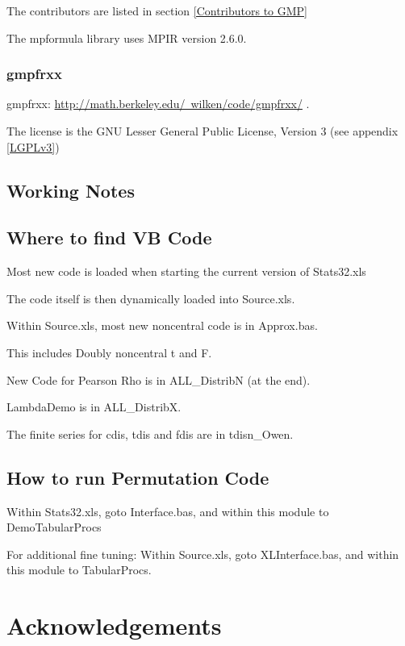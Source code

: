The contributors are listed in section \ref{Contributors to GMP}

The mpformula library uses MPIR version 2.6.0.



\subsection{gmpfrxx}
gmpfrxx: \href{http://math.berkeley.edu/~wilken/code/gmpfrxx/}{http://math.berkeley.edu/~wilken/code/gmpfrxx/} .

The license is the GNU Lesser General Public License, Version 3 (see appendix \ref{LGPLv3})

%

\section{Working Notes}

\section{Where to find VB Code}
Most new code is loaded when starting the current version of Stats32.xls

The code itself is then dynamically loaded into Source.xls.

Within Source.xls, most new noncentral code is in Approx.bas.

This includes Doubly noncentral t and F.

New Code for Pearson Rho is in ALL\_DistribN (at the end).

LambdaDemo is in ALL\_DistribX.

The finite series for cdis, tdis and fdis are in tdisn\_Owen.


\section{How to run Permutation Code}

Within Stats32.xls, goto Interface.bas, and within this module to DemoTabularProcs

For additional fine tuning: 
Within Source.xls, goto XLInterface.bas, and within this module to TabularProcs.





\chapter{Acknowledgements} 

